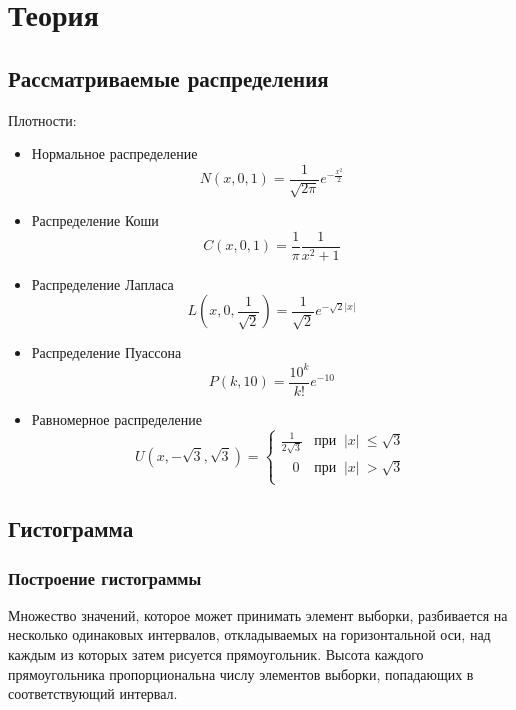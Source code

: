 \documentclass[a4paper]{article}
\begin{document}
\section {Теория}
	\subsection{Рассматриваемые распределения}
    Плотности:
    \begin{itemize}
        \item Нормальное распределение
        \begin{equation}\label{eq:norm}
            N(x,0,1)=\frac{1}{\sqrt{2\pi}}e^{-\frac{x^2}{2}}
        \end{equation}
        \item Распределение Коши
        \begin{equation}\label{eq:cauchy}
            C(x, 0, 1)=\frac{1}{\pi}\frac{1}{x^2+1}
        \end{equation}
        \item Распределение Лапласа
        \begin{equation}\label{eq:laplace}
            L(x,0,\frac{1}{\sqrt{2}})=\frac{1}{\sqrt{2}}e^{-\sqrt{2}|x|}
        \end{equation}
        \item Распределение Пуассона
        \begin{equation}\label{eq:poisson}
            P(k, 10)=\frac{10^k}{k!}e^{-10}
        \end{equation}
        \item Равномерное распределение
            \begin{equation}\label{eq:uniform}
                U(x,-\sqrt{3},\sqrt{3})=
                \begin{cases}
                \displaystyle\frac{1}{2\sqrt{3}}&\text{при}\;\;|x|\:\leq\sqrt{3}\\
                \;\;\;0&\text{при}\;\;|x|\:>\sqrt{3}\\
                \end{cases}
            \end{equation}
		\end{itemize}
	\subsection{Гистограмма}
		\subsubsection{Построение гистограммы}
		Множество значений, которое может принимать элемент выборки, разбивается на несколько одинаковых интервалов, откладываемых на горизонтальной оси, над каждым из которых затем рисуется прямоугольник.
		Высота каждого прямоугольника пропорциональна числу элементов выборки, попадающих в соответствующий интервал.
\end{document}
